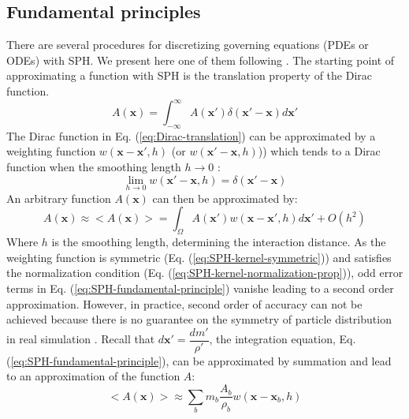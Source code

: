 \documentclass[journal abbreviation, manuscript]{copernicus}
\begin{document}
\subsection{Fundamental principles}
There are several procedures for discretizing governing equations (PDEs or ODEs) with SPH. We present here one of them following \citet{monaghan1992smoothed, monaghan2005smoothed, monaghan2012smoothed}. The starting point of approximating a function with SPH is the translation property of the Dirac function.
\begin{equation}
A\left(\textbf{x}\right)=\int_{-\infty}^{\infty} A\left(\textbf{x} \prime\right) \delta \left(\textbf{x} \prime - \textbf{x}\right) d\textbf{x} \prime
\label{eq:Dirac-translation}
\end{equation}
The Dirac function in Eq. (\ref{eq:Dirac-translation}) can be approximated by a weighting function $w\left(\textbf{x}-\textbf{x}\prime, h\right)$ (or $w\left(\textbf{x}\prime-\textbf{x}, h\right)$)) which tends to a Dirac function when the smoothing length $h \rightarrow 0$ :
\begin{equation}
\lim _{h \rightarrow 0} w\left(\textbf{x} \prime-\textbf{x}, h\right) =  \delta \left(\textbf{x} \prime - \textbf{x}\right)
\label{eq:SPH_kernel_delta}
\end{equation}
An arbitrary function $A\left(\textbf{x}\right)$ can then be approximated by:
\begin{equation}
A\left(\textbf{x}\right) \approx <A\left(\textbf{x}\right)> = \int_{\Omega} A\left(\textbf{x} \prime\right) w\left(\textbf{x}-\textbf{x}\prime, h\right) d\textbf{x}\prime + O\left(h^2\right)
\label{eq:SPH-fundamental-principle}
\end{equation}
Where $h$ is the smoothing length, determining the interaction distance. As the weighting function is symmetric (Eq. (\ref{eq:SPH-kernel-symmetric})) and satisfies the normalization condition (Eq. (\ref{eq:SPH-kernel-normalization-prop})), odd error terms in Eq. (\ref{eq:SPH-fundamental-principle}) vanishe leading to a second order approximation. However, in practice, second order of accuracy can not be achieved because there is no guarantee on the symmetry of particle distribution in real simulation \citep{price2012smoothed}.
Recall that $d\textbf{x}\prime = \dfrac{dm \prime}{\rho \prime}$, the integration equation, Eq. (\ref{eq:SPH-fundamental-principle}), can be approximated by summation and lead to an approximation of the function $A$:
\begin{equation}
<A\left(\textbf{x}\right)> \approx \sum_b m_b \dfrac{A_b}{\rho_b} w\left(\textbf{x}-\textbf{x}_b, h\right)
\label{eq:SPH-approximation-sum}
\end{equation}
\end{document}
